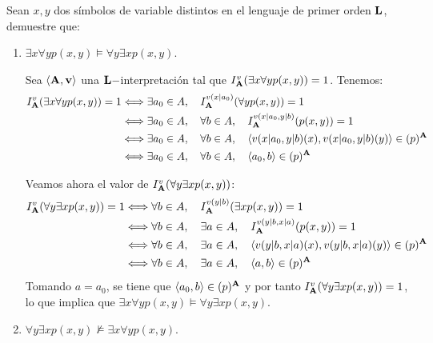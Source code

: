 \begin{ejercicio}
    Sean $x,y$ dos símbolos de variable distintos en el lenguaje de primer orden $\bf{L}$, demuestre que:
    \begin{enumerate}
        \item $\exists x\forall y p(x,y)\models \forall y\exists x p(x,y)$.
        
        Sea $\langle \bf{A},v\rangle$ una $\bf{L}-$interpretación tal que $I_{\bf{A}}^v(\exists x\forall y p(x,y))=1$. Tenemos:
        \begin{align*}
            I_{\bf{A}}^v(\exists x\forall y p(x,y)) = 1
            & \Longleftrightarrow \exists a_0\in A,\quad  I_{\bf{A}}^{v(x|a_0)}(\forall y p(x,y))=1\\
            & \Longleftrightarrow \exists a_0\in A,\quad  \forall b\in A,\quad I_{\bf{A}}^{v(x|a_0,y|b)}(p(x,y))=1 \\
            & \Longleftrightarrow \exists a_0\in A,\quad  \forall b\in A,\quad \langle v(x|a_0,y|b)(x),v(x|a_0,y|b)(y)\rangle\in (p)^{\bf{A}}\\
            & \Longleftrightarrow \exists a_0\in A,\quad  \forall b\in A,\quad \langle a_0,b\rangle\in (p)^{\bf{A}}
        \end{align*}

        Veamos ahora el valor de $I_{\bf{A}}^v(\forall y\exists x p(x,y))$:
        \begin{align*}
            I_{\bf{A}}^v(\forall y\exists x p(x,y)) = 1
            & \Longleftrightarrow \forall b\in A,\quad  I_{\bf{A}}^{v(y|b)}(\exists x p(x,y))=1\\
            & \Longleftrightarrow \forall b\in A,\quad  \exists a\in A,\quad I_{\bf{A}}^{v(y|b,x|a)}(p(x,y))=1\\
            & \Longleftrightarrow \forall b\in A,\quad  \exists a\in A,\quad \langle v(y|b,x|a)(x),v(y|b,x|a)(y)\rangle\in (p)^{\bf{A}}\\
            & \Longleftrightarrow \forall b\in A,\quad  \exists a\in A,\quad \langle a,b\rangle\in (p)^{\bf{A}}
        \end{align*}
        Tomando $a=a_0$, se tiene que $\langle a_0,b\rangle\in (p)^{\bf{A}}$ y por tanto $I_{\bf{A}}^v(\forall y\exists x p(x,y))=1$,
        lo que implica que $\exists x\forall y p(x,y)\models \forall y\exists x p(x,y)$.

        \item $\forall y\exists x p(x,y)\not\models \exists x\forall y p(x,y)$.
        

\end{enumerate}
\end{ejercicio}
